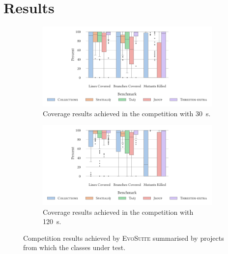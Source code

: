 \documentclass[10pt,conference]{IEEEtran}
\newcommand{\EVOSUITE}{\textsc{EvoSuite}\xspace}
\begin{document}
\section{Results}


\begin{figure}
  \centering

  \begin{subfigure}{0.9\columnwidth}
    \includegraphics[width=\linewidth]{data/CoverageByBenchmark30.pdf}
    \caption{Coverage results achieved in the competition with \SI{30}{\second}.}
    \label{fig:results30}
  \end{subfigure}

  \begin{subfigure}{0.9\columnwidth}
    \includegraphics[width=\linewidth]{data/CoverageByBenchmark120.pdf}
    \caption{Coverage results achieved in the competition with \SI{120}{\second}.}
    \label{fig:results120}
  \end{subfigure}

  \caption{Competition results achieved by \EVOSUITE summarised by projects from which the classes under test.}
  \label{fig:figures}
\end{figure}
\end{document}
